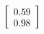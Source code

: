 \documentclass[preview]{standalone}
\begin{document}
\begin{align*}
\begin{bmatrix} 0.59 \\ 0.98 \end{bmatrix}
\end{align*}
\end{document}
